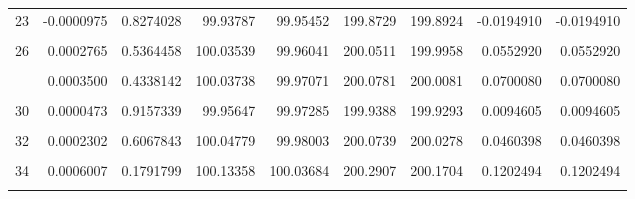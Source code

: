\documentclass[a4paper]{tufte-handout}
\begin{document}
\begin{table}
{\begin{tabular}[t]{rrrrrrrrr}
23 & -0.0000975 & 0.8274028 & 99.93787 & 99.95452 & 199.8729 & 199.8924 & -0.0194910 & -0.0194910\\
\cellcolor{gray!6}{25} & \cellcolor{gray!6}{0.0002461} & \cellcolor{gray!6}{0.5820510} & \cellcolor{gray!6}{99.98915} & \cellcolor{gray!6}{100.07462} & \cellcolor{gray!6}{200.1130} & \cellcolor{gray!6}{200.0638} & \cellcolor{gray!6}{0.0492442} & \cellcolor{gray!6}{0.0492442}\\
26 & 0.0002765 & 0.5364458 & 100.03539 & 99.96041 & 200.0511 & 199.9958 & 0.0552920 & 0.0552920\\
\cellcolor{gray!6}{27} & \cellcolor{gray!6}{0.0000876} & \cellcolor{gray!6}{0.8447762} & \cellcolor{gray!6}{99.95505} & \cellcolor{gray!6}{99.98080} & \cellcolor{gray!6}{199.9534} & \cellcolor{gray!6}{199.9358} & \cellcolor{gray!6}{0.0175062} & \cellcolor{gray!6}{0.0175062}\\
\addlinespace
28 & 0.0003500 & 0.4338142 & 100.03738 & 99.97071 & 200.0781 & 200.0081 & 0.0700080 & 0.0700080\\
\cellcolor{gray!6}{29} & \cellcolor{gray!6}{-0.0002572} & \cellcolor{gray!6}{0.5652014} & \cellcolor{gray!6}{99.96146} & \cellcolor{gray!6}{99.97635} & \cellcolor{gray!6}{199.8864} & \cellcolor{gray!6}{199.9378} & \cellcolor{gray!6}{-0.0514255} & \cellcolor{gray!6}{-0.0514255}\\
30 & 0.0000473 & 0.9157339 & 99.95647 & 99.97285 & 199.9388 & 199.9293 & 0.0094605 & 0.0094605\\
\cellcolor{gray!6}{31} & \cellcolor{gray!6}{0.0000813} & \cellcolor{gray!6}{0.8557782} & \cellcolor{gray!6}{100.03076} & \cellcolor{gray!6}{99.98796} & \cellcolor{gray!6}{200.0350} & \cellcolor{gray!6}{200.0187} & \cellcolor{gray!6}{0.0162578} & \cellcolor{gray!6}{0.0162578}\\
32 & 0.0002302 & 0.6067843 & 100.04779 & 99.98003 & 200.0739 & 200.0278 & 0.0460398 & 0.0460398\\
\addlinespace
\cellcolor{gray!6}{33} & \cellcolor{gray!6}{0.0004089} & \cellcolor{gray!6}{0.3604991} & \cellcolor{gray!6}{100.03151} & \cellcolor{gray!6}{100.06965} & \cellcolor{gray!6}{200.1830} & \cellcolor{gray!6}{200.1012} & \cellcolor{gray!6}{0.0818291} & \cellcolor{gray!6}{0.0818291}\\
34 & 0.0006007 & 0.1791799 & 100.13358 & 100.03684 & 200.2907 & 200.1704 & 0.1202494 & 0.1202494\\
\cellcolor{gray!6}{35} & \cellcolor{gray!6}{0.0001666} & \cellcolor{gray!6}{0.7094596} & \cellcolor{gray!6}{100.05569} & \cellcolor{gray!6}{100.06161} & \cellcolor{gray!6}{200.1507} & \cellcolor{gray!6}{200.1173} & \cellcolor{gray!6}{0.0333443} & \cellcolor{gray!6}{0.0333443}\\

\end{tabular}}
\end{table}
\end{document}
